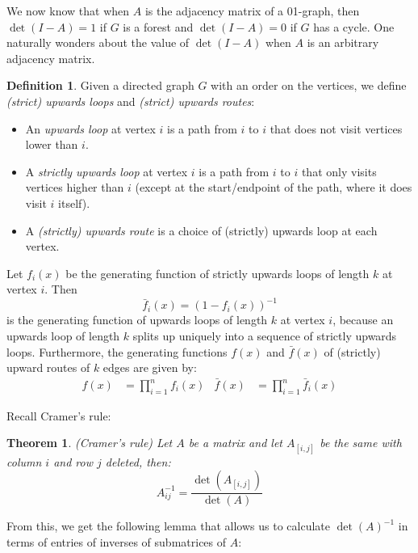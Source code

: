 \documentclass[a4paper, 11pt]{article}
\newtheorem{theorem}{Theorem}[section]
\theoremstyle{definition}
\newtheorem{definition}{Definition}[section]
\begin{document}
We now know that when $A$ is the adjacency matrix of a 01-graph, then $\det(I - A) = 1$ if $G$ is a forest and $\det(I - A) = 0$ if $G$ has a cycle. One naturally wonders about the value of $\det(I - A)$ when $A$ is an arbitrary adjacency matrix.

\begin{definition}
  Given a directed graph $G$ with an order on the vertices, we define \emph{(strict) upwards loops} and \emph{(strict) upwards routes}:
  \begin{itemize}
    \item An \emph{upwards loop} at vertex $i$ is a path from $i$ to $i$ that does not visit vertices lower than $i$.
    \item A \emph{strictly upwards loop} at vertex $i$ is a path from $i$ to $i$ that only visits vertices higher than $i$ (except at the start/endpoint of the path, where it does visit $i$ itself).
    \item A \emph{(strictly) upwards route} is a choice of (strictly) upwards loop at each vertex.
  \end{itemize}
  Let $f_i(x)$ be the generating function of strictly upwards loops of length $k$ at vertex $i$. Then \[ \bar{f}_i(x) = (1 - f_i(x))^{-1} \] is the generating function of upwards loops of length $k$ at vertex $i$, because an upwards loop of length $k$ splits up uniquely into a sequence of strictly upwards loops. Furthermore, the generating functions $f(x)$ and $\bar{f}(x)$ of (strictly) upward routes of $k$ edges are given by:
  \begin{align*}
    f(x) &= \prod_{i=1}^n f_i(x) &
    \bar{f}(x) &= \prod_{i=1}^n \bar{f}_i(x)
  \end{align*}
\end{definition}

Recall Cramer's rule:
\begin{theorem} (Cramer's rule)
  Let $A$ be a matrix and let $A_{[i,j]}$ be the same with column $i$ and row $j$ deleted, then:
  \[ A^{-1}_{ij} = \frac{\det(A_{[i,j]})}{\det(A)} \]
\end{theorem}

From this, we get the following lemma that allows us to calculate $\det(A)^{-1}$ in terms of entries of inverses of submatrices of $A$:
\end{document}
